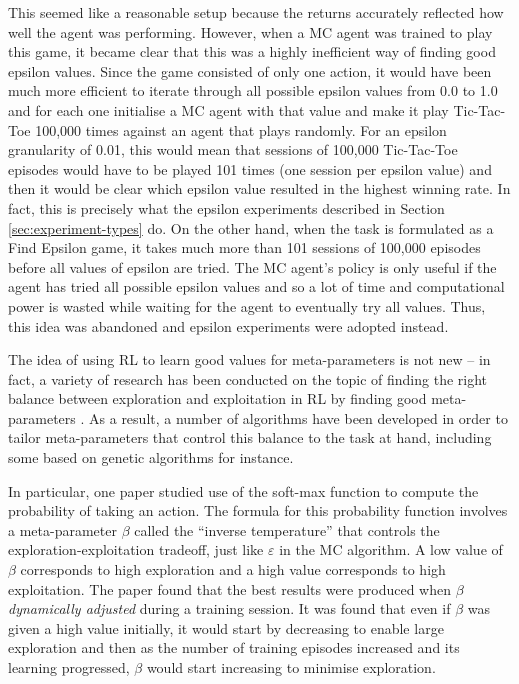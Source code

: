 \documentclass[11pt,a4paper]{report}
\begin{document}
This seemed like a reasonable setup because the returns accurately reflected how well the agent was performing. However, when a MC agent was trained to play this game, it became clear that this was a highly inefficient way of finding good epsilon values. Since the game consisted of only one action, it would have been much more efficient to iterate through all possible epsilon values from 0.0 to 1.0 and for each one initialise a MC agent with that value and make it play Tic-Tac-Toe 100,000 times against an agent that plays randomly. For an epsilon granularity of 0.01, this would mean that sessions of 100,000 Tic-Tac-Toe episodes would have to be played 101 times (one session per epsilon value) and then it would be clear which epsilon value resulted in the highest winning rate. In fact, this is precisely what the epsilon experiments described in Section \ref{sec:experiment-types} do. On the other hand, when the task is formulated as a Find Epsilon game, it takes much more than 101 sessions of 100,000 episodes before all values of epsilon are tried. The MC agent's policy is only useful if the agent has tried all possible epsilon values and so a lot of time and computational power is wasted while waiting for the agent to eventually try all values. Thus, this idea was abandoned and epsilon experiments were adopted instead.

The idea of using RL to learn good values for meta-parameters is not new -- in fact, a variety of research has been conducted on the topic of finding the right balance between exploration and exploitation in RL by finding good meta-parameters \cite{meta-optimization} \cite{meta-param-evolution} \cite{exploration-exploitation-meta-param} \cite{meta-learning-rl}. As a result, a number of algorithms have been developed in order to tailor meta-parameters that control this balance to the task at hand, including some based on genetic algorithms \cite{meta-param-evolution} for instance.

In particular, one paper \cite{meta-learning-rl} studied use of the soft-max function to compute the probability of taking an action. The formula for this probability function involves a meta-parameter $\beta$ called the ``inverse temperature'' that controls the exploration-exploitation tradeoff, just like $\varepsilon$ in the MC algorithm. A low value of $\beta$ corresponds to high exploration and a high value corresponds to high exploitation. The paper found that the best results were produced when $\beta$ \emph{dynamically adjusted} during a training session. It was found that even if $\beta$ was given a high value initially, it would start by decreasing to enable large exploration and then as the number of training episodes increased and its learning progressed, $\beta$ would start increasing to minimise exploration.
\end{document}
